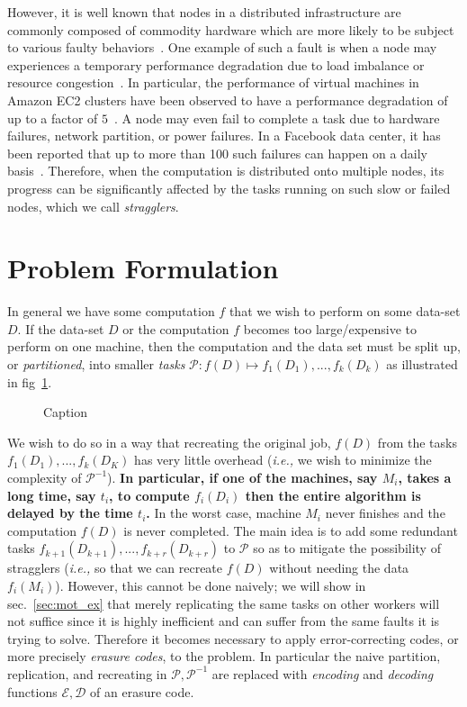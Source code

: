 \documentclass{report}
\begin{document}
However, it is well known that nodes in a distributed infrastructure are commonly composed of commodity hardware which are more likely to be subject to various faulty behaviors~\cite{Huang2017a}. 
One example of such a fault is when a node may experiences a temporary performance degradation due to load imbalance or resource congestion~\cite{Lee2018a}. 
In particular, the performance of virtual machines in Amazon EC2 clusters have been observed to have a performance degradation of up to a factor of $5$~\cite{Tandon2017, Lee2018a}. 
A node may even fail to complete a task due to hardware failures, network partition, or power failures. 
In a Facebook data center, it has been reported that up to more than 100 such failures can happen on a daily basis~\cite{Rashmi2013,Sathiamoorthy2013}.
Therefore, when the computation is distributed onto multiple nodes, its progress can be significantly affected by the tasks running on such slow or failed
nodes, which we call {\em stragglers}.

\section{Problem Formulation}

In general we have some computation $f$ that we wish to perform on some data-set $D$. If the data-set $D$ or the computation $f$ becomes too large/expensive to perform on one machine, then the computation and the data set must be split up, or \emph{partitioned}, into smaller \emph{tasks} $\mathcal{P} : f(D) \mapsto f_1(D_1) ,..., f_k(D_k)$ as illustrated in fig~\ref{fig:1}. 
\begin{figure}
    \centering
    \caption{Caption}
    \label{fig:1}
\end{figure}
We wish to do so in a way that recreating the original job, $f(D)$ from the tasks $f_1(D_1) , ..., f_k(D_K)$ has very little overhead (\emph{i.e.,} we wish to minimize the complexity of $\mathcal{P}^{-1}$). 
\textbf{In particular, if one of the machines, say $M_i$, takes a long time, say $t_i$, to compute $f_i(D_i)$ then the entire algorithm is delayed by the time $t_i$.} In the worst case, machine $M_i$ never finishes and the computation $f(D)$ is never completed. 
The main idea is to add some redundant tasks $f_{k+1}(D_{k+1}),...,f_{k+r}(D_{k+r})$ to $\mathcal{P}$ so as to mitigate the possibility of stragglers (\emph{i.e.,} so that we can recreate $f(D)$ without needing the data $f_i(M_i)$).
However, this cannot be done naively; we will show in sec.~\ref{sec:mot_ex} that merely replicating the same tasks on other workers will not suffice since it is highly inefficient and can suffer from the same faults it is trying to solve. Therefore it becomes necessary to apply error-correcting codes, or more precisely \textit{erasure codes}, to the problem. In particular the naive partition, replication, and recreating in $\mathcal{P},\mathcal{P}^{-1}$ are replaced with \emph{encoding} and \emph{decoding} functions $\mathcal{E},\mathcal{D}$ of an erasure code. 
\end{document}
